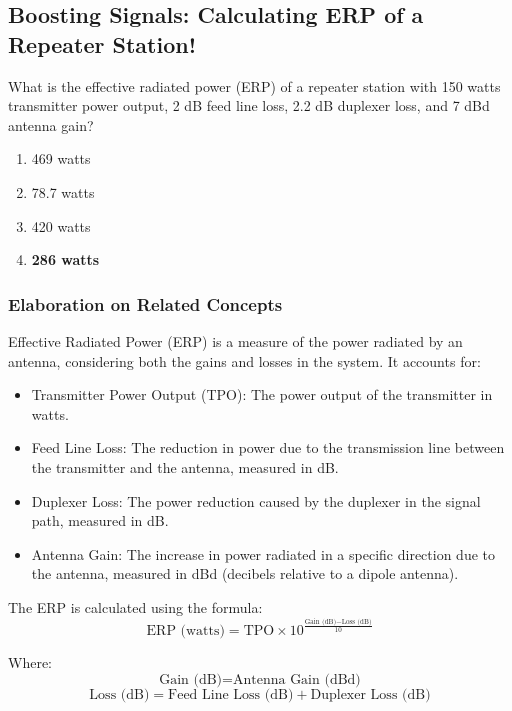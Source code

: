 \subsection{Boosting Signals: Calculating ERP of a Repeater Station!}

\begin{tcolorbox}[colback=gray!10, colframe=black, title=E9A02]
     What is the effective radiated power (ERP) of a repeater station with 150 watts transmitter power output, 2 dB feed line loss, 2.2 dB duplexer loss, and 7 dBd antenna gain?

\begin{enumerate}[label=\Alph*.]
    \item 469 watts
    \item 78.7 watts
    \item 420 watts
    \item \textbf{286 watts}
\end{enumerate} \end{tcolorbox}

\subsubsection*{Elaboration on Related Concepts}

Effective Radiated Power (ERP) is a measure of the power radiated by an antenna, considering both the gains and losses in the system. It accounts for:
\begin{itemize}
    \item Transmitter Power Output (TPO): The power output of the transmitter in watts.
    \item Feed Line Loss: The reduction in power due to the transmission line between the transmitter and the antenna, measured in dB.
    \item Duplexer Loss: The power reduction caused by the duplexer in the signal path, measured in dB.
    \item Antenna Gain: The increase in power radiated in a specific direction due to the antenna, measured in dBd (decibels relative to a dipole antenna).
\end{itemize}

The ERP is calculated using the formula:
\[
\text{ERP (watts)} = \text{TPO} \times 10^{\frac{\text{Gain (dB)} - \text{Loss (dB)}}{10}}
\]

Where:
\[
\text{Gain (dB)} = \text{Antenna Gain (dBd)}
\]
\[
\text{Loss (dB)} = \text{Feed Line Loss (dB)} + \text{Duplexer Loss (dB)}
\]


